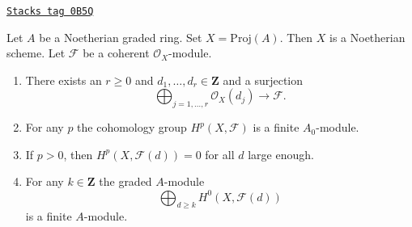 \begin{lemma}
\label{coherent-lemma-coherent-on-proj-general}
\href{https://stacks.math.columbia.edu/tag/0B5Q}{\texttt{Stacks tag 0B5Q}}

Let $A$ be a Noetherian graded ring. Set $X = \text{Proj}(A)$. Then $X$
is a Noetherian scheme. Let $\mathcal{F}$ be a coherent $\mathcal{O}_X$-module.
\begin{enumerate}
\item There exists an $r \geq 0$ and
$d_1, \ldots, d_r \in \mathbf{Z}$ and a surjection
$$
\bigoplus\nolimits_{j = 1, \ldots, r} \mathcal{O}_X(d_j)
\longrightarrow \mathcal{F}.
$$
\item For any $p$ the cohomology group $H^p(X, \mathcal{F})$ is a finite
$A_0$-module.
\item If $p > 0$, then $H^p(X, \mathcal{F}(d)) = 0$ for all $d$ large enough.
\item For any $k \in \mathbf{Z}$ the graded $A$-module
$$
\bigoplus\nolimits_{d \geq k} H^0(X, \mathcal{F}(d))
$$
is a finite $A$-module.
\end{enumerate}
\end{lemma}

